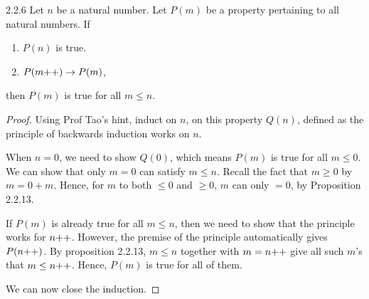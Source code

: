 \begin{exercise}{2.2.6}
	Let $n$ be a natural number. Let $P(m)$ be a property pertaining to all natural numbers. If
	\begin{enumerate}
		\item $P(n)$ is true.
		\item $P(m{+}{+}) \to P(m)$,
	\end{enumerate}
	then $P(m)$ is true for all $m \le n$.
\end{exercise}
\begin{proof}
	Using Prof Tao's hint, induct on $n$, on this property $Q(n)$, defined as the principle of backwards induction works on $n$.
	
	When $n = 0$, we need to show $Q(0)$, which means $P(m)$ is true for all $m \le 0$. We can show that only $m=0$ can satisfy $m \le n$. Recall the fact that $m \ge 0$ by $m = 0+m$. Hence, for $m$ to both $\le 0$ and $\ge 0$, $m$ can only $=0$, by Proposition 2.2.13.
	
	If $P(m)$ is already true for all $m \le n$, then we need to show that the principle works for $n{+}{+}$. However, the premise of the principle automatically gives $P(n{+}{+})$. By proposition 2.2.13, $m \le n$ together with $m = n{+}{+}$ give all such $m$'s that $m \le n{+}{+}$. Hence, $P(m)$ is true for all of them.
	
	We can now close the induction.
\end{proof}

